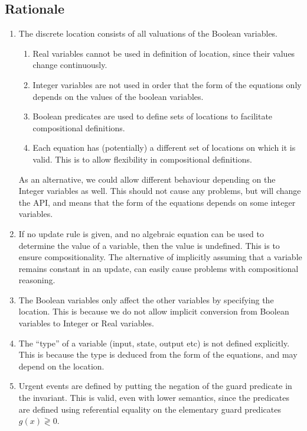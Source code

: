 \documentclass[a4paper,11pt]{article}
\begin{document}
\subsection*{Rationale}

\begin{enumerate}[(R1)]
 \item The discrete location consists of all valuations of the Boolean variables. 
 \begin{enumerate}
  \item Real variables cannot be used in definition of location, since their values change continuously. 
  \item Integer variables are not used in order that the form of the equations only depends on the values of the boolean variables.
  \item Boolean predicates are used to define sets of locations to facilitate compositional definitions.
  \item Each equation has (potentially) a different set of locations on which it is valid. This is to allow flexibility in compositional definitions. 
 \end{enumerate}
 As an alternative, we could allow different behaviour depending on the Integer variables as well. This should not cause any problems, but will change the API, and means that the form of the equations depends on some integer variables.
 
 \item If no update rule is given, and no algebraic equation can be used to determine the value of a variable, then the value is undefined. This is to ensure compositionality. The alternative of implicitly assuming that a variable remains constant in an update, can easily cause problems with compositional reasoning.
 
 \item The Boolean variables only affect the other variables by specifying the location. This is because we do not allow implicit conversion from Boolean variables to Integer or Real variables. 

 \item The ``type'' of a variable (input, state, output etc) is not defined explicitly. This is because the type is deduced from the form of the equations, and may depend on the location.
 
 \item Urgent events are defined by putting the negation of the guard predicate in the invariant. This is valid, even with lower semantics, since the predicates are defined using referential equality on the elementary guard predicates $g(x) \gtrless 0$.
\end{enumerate}
\end{document}
